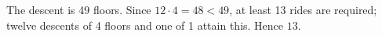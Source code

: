 The descent is 49 floors. Since $12\cdot4=48<49$, at least 13 rides are required; twelve descents of 4 floors and one of 1 attain this. Hence $\boxed{13}$.
